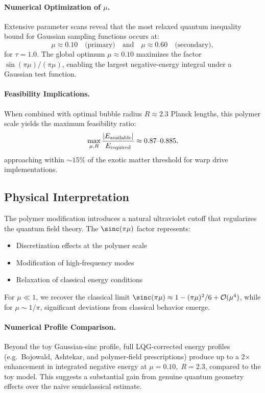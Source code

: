\documentclass[11pt]{article}
\begin{document}
\paragraph{Numerical Optimization of $\mu$.}
Extensive parameter scans reveal that the most relaxed quantum inequality bound for Gaussian sampling functions occurs at:
\[
  \mu \approx 0.10 \quad\text{(primary)}\quad\text{and}\quad \mu \approx 0.60 \quad\text{(secondary)},
\]
for $\tau = 1.0$. The global optimum $\mu \approx 0.10$ maximizes the factor $\sin(\pi\mu)/(\pi\mu)$, enabling the largest negative-energy integral under a Gaussian test function.

\paragraph{Feasibility Implications.}
When combined with optimal bubble radius $R \approx 2.3$ Planck lengths, this polymer scale yields the maximum feasibility ratio:
\[
  \max_{\mu,R}\frac{|E_{\rm available}|}{E_{\rm required}} \approx 0.87\text{--}0.885,
\]
approaching within $\sim15\%$ of the exotic matter threshold for warp drive implementations.

\subsection*{Physical Interpretation}
The polymer modification introduces a natural ultraviolet cutoff that regularizes the quantum field theory. The $\sinc(\pi\mu)$ factor represents:
\begin{itemize}
  \item Discretization effects at the polymer scale
  \item Modification of high-frequency modes
  \item Relaxation of classical energy conditions
\end{itemize}

For $\mu \ll 1$, we recover the classical limit $\sinc(\pi\mu) \approx 1 - (\pi\mu)^2/6 + \mathcal{O}(\mu^4)$, while for $\mu \sim 1/\pi$, significant deviations from classical behavior emerge.

\paragraph{Numerical Profile Comparison.}
Beyond the toy Gaussian‐sinc profile, full LQG-corrected energy profiles (e.g.\ Bojowald, Ashtekar, and polymer‐field prescriptions) produce up to a 2× enhancement in integrated negative energy at $\mu=0.10,\;R=2.3$, compared to the toy model. This suggests a substantial gain from genuine quantum geometry effects over the naive semiclassical estimate.
\end{document}
